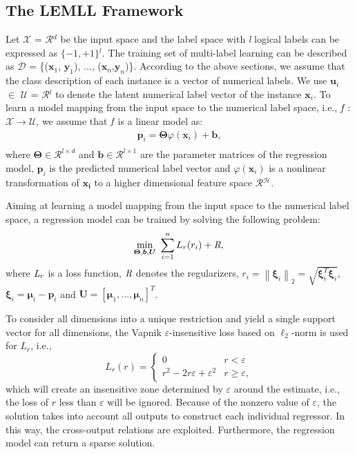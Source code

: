 \documentclass[conference]{IEEEtran}
\begin{document}
\subsection{The LEMLL Framework}
Let $\mathcal{X}$ = $\mathcal{R}$$^d$ be the input space and the label space with \emph{l} logical labels can be expressed as $\{-1, +1\}$$^l$. The training set of multi-label learning can be described as $\mathcal{D}$ = \{($\bm{x}_{1}$, $\bm{y}_{1}$), ..., ($\bm{x}_{n}$,$\bm{y}_{n}$)\}. According to the above sections, we assume that the class description of each instance is a vector of numerical labels. We use $\bm{u}_{i}$ $\in$ $\mathcal{U}$ = $\mathcal{R}$$^l$ to denote the latent numerical label vector of the instance $\bm{x}_{i}$. To learn a model mapping from the input space to the numerical label space, i.e., $\emph{f}$ : $\mathcal{X}$$\to$$\mathcal{U}$, we assume that $\emph{f}$ is a linear model as:
\begin{equation}
\begin{split}
\bm{p}_i = \bm{\Theta}\varphi(\bm{x}_i)+\bm{b},\\
\end{split}
\end{equation}
where $\bm{\Theta} \in \mathcal{R}^{l \times d}$ and $\bm{b} \in \mathcal{R}^{l\times 1}$ are the parameter matrices of the regression model, $\bm{p}_i$ is the predicted numerical label vector and $\varphi(\bm{x}_i)$ is a nonlinear transformation of $\bm{x_i}$ to a higher dimensional feature space $\mathcal{R}$$^\mathcal{H}$.

Aiming at learning a model mapping from the input space to the numerical label space, a regression model can be trained by solving the following problem:
\begin{equation}
\mathop {\min }\limits_{\bm{\Theta}, \bm{b}, \bm{U}} \ \sum_{i=1}^nL_r(r_i) +  \emph{R},\\
\end{equation}
where $\emph{L}_{r}$ is a loss function, $\emph{R}$ denotes the regularizers, $r_i=\left\lVert \bm{\xi}_i \right\rVert_2=\sqrt{\bm{\xi}_i^T\bm{\xi}_i}$, $\bm{\xi}_i=\bm{\mu}_i-\bm{p}_i$ and $\bm{U}=[\bm{\mu}_1, ..., \bm{\mu}_n ]^T$.

To consider all dimensions into a unique restriction and yield a single support vector for all dimensions, the Vapnik $\varepsilon$-insensitive loss based on $\ell_2$-norm is used for $L_r$, i.e.,
\begin{equation}
L_r(r)=
\left\{
     \begin{array}{lr}
     0 &r<\varepsilon\\
     r^2-2r\varepsilon+\varepsilon^2 &r \geq \varepsilon,
     \end{array}
\right.
\end{equation}
which will create an insensitive zone determined by $\varepsilon$ around the estimate, i.e., the loss of $r$ less than $\varepsilon$ will be ignored. Because of the nonzero value of $\varepsilon$, the solution takes into account all outputs to construct each individual regressor. In this way, the cross-output relations are exploited. Furthermore, the regression model can return a sparse solution.
\end{document}
